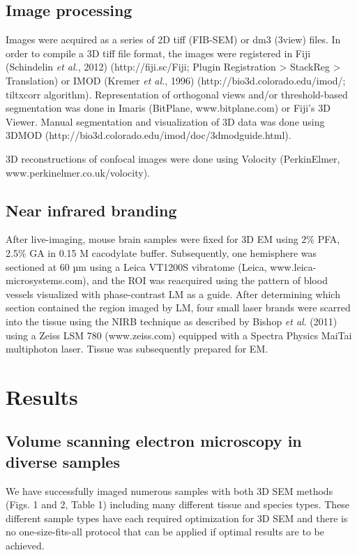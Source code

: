 \documentclass{article}
\begin{document}
\subsection*{Image processing}

Images were acquired as a series of 2D tiff (FIB-SEM) or dm3 (3view) files. In order to compile a 3D tiff file format, the images were registered in Fiji (Schindelin \textit{et al.}, 2012) (http://fiji.sc/Fiji; Plugin Registration > StackReg > Translation) or IMOD (Kremer \textit{et al.}, 1996) (http://bio3d.colorado.edu/imod/; tiltxcorr algorithm). Representation of orthogonal views and/or threshold-based segmentation was done in Imaris (BitPlane, www.bitplane.com) or Fiji’s 3D Viewer. Manual segmentation and visualization of 3D data was done using 3DMOD (http://bio3d.colorado.edu/imod/doc/3dmodguide.html).

3D reconstructions of confocal images were done using Volocity (PerkinElmer, www.perkinelmer.co.uk/volocity).

\subsection*{Near infrared branding}

After live-imaging, mouse brain samples were fixed for 3D EM using 2\% PFA, 2.5\% GA in 0.15 M cacodylate buffer. Subsequently, one hemisphere was sectioned at 60 µm using a Leica VT1200S vibratome (Leica, www.leica-microsystems.com), and the ROI was reacquired using the pattern of blood vessels visualized with phase-contrast LM as a guide. After determining which section contained the region imaged by LM, four small laser brands were scarred into the tissue using the NIRB technique as described by Bishop \textit{et al}. (2011) using a Zeiss LSM 780 (www.zeiss.com) equipped with a Spectra Physics MaiTai multiphoton laser. Tissue was subsequently prepared for EM.

\section*{Results}

\subsection*{Volume scanning electron microscopy in diverse samples}

We have successfully imaged numerous samples with both 3D SEM methods (Figs. 1 and 2, Table 1) including many different tissue and species types. These different sample types have each required optimization for 3D SEM and there is no one-size-fits-all protocol that can be applied if optimal results are to be achieved.
\end{document}
